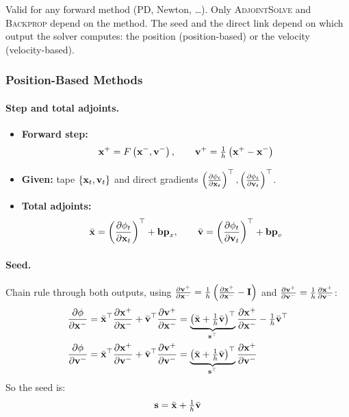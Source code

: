 \noindent Valid for any forward method (PD, Newton, \dots). Only \textsc{AdjointSolve} and \textsc{Backprop} depend on the method. The seed and the direct link depend on which output the solver computes: the position (position-based) or the velocity (velocity-based).

\subsubsection{Position-Based Methods}
\label{sec:npd_seed_pos}

\paragraph{Step and total adjoints.}
\begin{itemize}
    \item \textbf{Forward step:}
    \begin{equation*}
        \mathbf{x}^+ = F\left(\mathbf{x}^-, \mathbf{v}^-\right), \qquad \mathbf{v}^+ = \tfrac{1}{h}\left(\mathbf{x}^+ - \mathbf{x}^-\right)
    \end{equation*}
    \item \textbf{Given:} tape $\left\{\mathbf{x}_t, \mathbf{v}_t\right\}$ and direct gradients $\left(\frac{\partial \phi_t}{\partial \mathbf{x}_t}\right)^\top, \left(\frac{\partial \phi_t}{\partial \mathbf{v}_t}\right)^\top$.
    \item \textbf{Total adjoints:}
    \begin{equation*}
        \bar{\mathbf{x}} = \left(\frac{\partial \phi_t}{\partial \mathbf{x}_t}\right)^\top + \mathbf{bp}_x,
        \qquad
        \bar{\mathbf{v}} = \left(\frac{\partial \phi_t}{\partial \mathbf{v}_t}\right)^\top + \mathbf{bp}_v
    \end{equation*}
\end{itemize}

\paragraph{Seed.} Chain rule through both outputs, using $\frac{\partial \mathbf{v}^+}{\partial \mathbf{x}^-} = \tfrac{1}{h}\left(\frac{\partial \mathbf{x}^+}{\partial \mathbf{x}^-} - \mathbf{I}\right)$ and $\frac{\partial \mathbf{v}^+}{\partial \mathbf{v}^-} = \tfrac{1}{h}\frac{\partial \mathbf{x}^+}{\partial \mathbf{v}^-}$:
\begin{align*}
    \frac{\partial \phi}{\partial \mathbf{x}^-} &= \bar{\mathbf{x}}^\top\frac{\partial \mathbf{x}^+}{\partial \mathbf{x}^-} + \bar{\mathbf{v}}^\top\frac{\partial \mathbf{v}^+}{\partial \mathbf{x}^-}
    = \underbrace{\left(\bar{\mathbf{x}} + \tfrac{1}{h}\bar{\mathbf{v}}\right)^\top}_{\mathbf{s}^\top}\frac{\partial \mathbf{x}^+}{\partial \mathbf{x}^-} - \tfrac{1}{h}\bar{\mathbf{v}}^\top \\
    \frac{\partial \phi}{\partial \mathbf{v}^-} &= \bar{\mathbf{x}}^\top\frac{\partial \mathbf{x}^+}{\partial \mathbf{v}^-} + \bar{\mathbf{v}}^\top\frac{\partial \mathbf{v}^+}{\partial \mathbf{v}^-}
    = \underbrace{\left(\bar{\mathbf{x}} + \tfrac{1}{h}\bar{\mathbf{v}}\right)^\top}_{\mathbf{s}^\top}\frac{\partial \mathbf{x}^+}{\partial \mathbf{v}^-}
\end{align*}
\noindent So the seed is:
\[\mathbf{s} = \bar{\mathbf{x}} + \tfrac{1}{h}\bar{\mathbf{v}}\]
